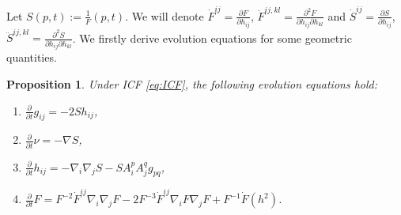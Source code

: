 \documentclass[10pt,a4paper]{amsart}
\newtheorem{proposition}[theorem]{Proposition}
\newcommand{\pd}[2]{\frac{\partial {#1}}{\partial {#2}}}
\numberwithin{equation}{section}
\begin{document}
Let \(S(p,t):=\frac{1}{F}(p,t)\). We will denote  $\dot{F}^{ij}=\frac{\partial F}{\partial h_{ij}}$, $\ddot{F}^{ij,kl}=\frac{\partial^2 F}{\partial h_{ij} \partial h_{kl}}$
and $\dot{S}^{ij}=\frac{\partial S}{\partial h_{ij}}$, $\ddot{S}^{ij,kl}=\frac{\partial^2 S}{\partial h_{ij} \partial h_{kl}}$. We firstly derive evolution equations for some geometric quantities.
\begin{proposition}\label{prop:evolution_geo_quantaties}
    Under ICF \eqref{eq:ICF}, the following evolution equations hold:
    \begin{enumerate}[label=(\arabic*)]
        \item \(\displaystyle \pd{}{t}g_{ij} = -2Sh_{ij}\),
        \item \(\displaystyle \pd{}{t}\nu = -\nabla S\),
        \item \(\displaystyle \pd{}{t}h_{ij} = -\nabla_i \nabla_j S - SA_i^p A_j^q g_{pq}\),
        \item \(\pd{}{t}F = F^{-2}\dot{F}^{ij}\nabla_i\nabla_j F - 2F^{-3}\dot{F}^{ij}\nabla_i F \nabla_j F + F^{-1}\dot{F}(h^2)\). 
    \end{enumerate}
\end{proposition}
\end{document}
